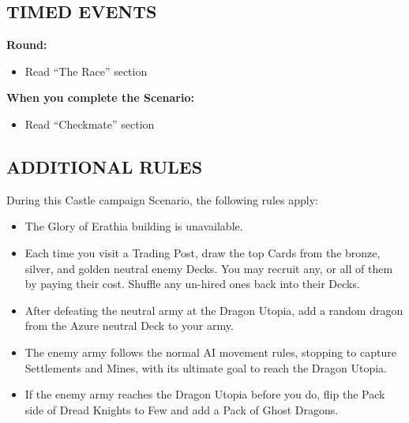 \newpage

\begin{multicols}{2}

\subsection*{\MakeUppercase{Timed Events}}

\textbf{ Round:}
\begin{itemize}
  \item Read ``The Race'' section
\end{itemize}

\textbf{When you complete the Scenario:}
\begin{itemize}
  \item Read ``Checkmate'' section
\end{itemize}

\subsection*{\MakeUppercase{Additional rules}}

During this Castle campaign Scenario, the following rules apply:

\begin{itemize}
  \item The Glory of Erathia building is unavailable.
  \item Each time you visit a Trading Post, draw the top Cards from the  bronze,  silver, and  golden neutral enemy Decks.
  You may recruit any, or all of them by paying their cost.
  Shuffle any un-hired ones back into their Decks.

  \item After defeating the neutral army at the Dragon Utopia, add a random dragon from the  Azure neutral Deck to your army.
  \item The enemy army follows the normal AI movement rules, stopping to capture Settlements and Mines, with its ultimate goal to reach the Dragon Utopia.
  \item If the enemy army reaches the Dragon Utopia before you do, flip the Pack side of Dread Knights to Few and add a Pack of Ghost Dragons.
\end{itemize}

\end{multicols}

